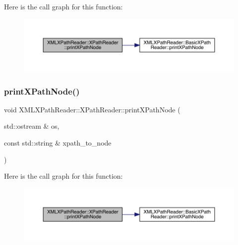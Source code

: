 Here is the call graph for this function\+:
\nopagebreak
\begin{figure}[H]
\begin{center}
\leavevmode
\includegraphics[width=350pt]{d3/d5a/classXMLXPathReader_1_1XPathReader_a8f751fb071319179252a48075239559c_cgraph}
\end{center}
\end{figure}
\mbox{\label{classXMLXPathReader_1_1XPathReader_a8f751fb071319179252a48075239559c}} 
\subsubsection{\texorpdfstring{printXPathNode()}{printXPathNode()}\hspace{0.1cm}{\footnotesize\ttfamily [3/3]}}
{\footnotesize\ttfamily void X\+M\+L\+X\+Path\+Reader\+::\+X\+Path\+Reader\+::print\+X\+Path\+Node (\begin{DoxyParamCaption}\item[{std\+::ostream \&}]{os,  }\item[{const std\+::string \&}]{xpath\+\_\+to\+\_\+node }\end{DoxyParamCaption})\hspace{0.3cm}{\ttfamily [inline]}}

Here is the call graph for this function\+:
\nopagebreak
\begin{figure}[H]
\begin{center}
\leavevmode
\includegraphics[width=350pt]{d3/d5a/classXMLXPathReader_1_1XPathReader_a8f751fb071319179252a48075239559c_cgraph}
\end{center}
\end{figure}
\mbox{\label{classXMLXPathReader_1_1XPathReader_a4df21ae718977be11eb5669002522ebb}} 
